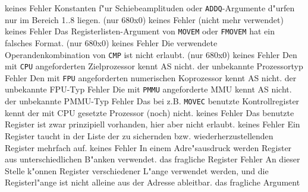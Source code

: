 \documentclass[12pt,a4paper,twoside]{report}
\newcommand{\tty}[1]{{\tt #1}}
\begin{document}
\begin{description}
               {keines}
               {Fehler}
               {Konstanten f"ur Schiebeamplituden oder
                \tty{ADDQ}-Argumente d"urfen nur im Bereich 1..8 liegen. (nur
                680x0)}
               {keines}
               {Fehler}
               {(nicht mehr verwendet)}
               {keines}
               {Fehler}
               {Das Registerlisten-Argument von \tty{MOVEM}
	        oder \tty{FMOVEM} hat ein falsches Format. (nur 680x0)}
               {keines}
               {Fehler}
               {Die verwendete Operandenkombination von \tty{CMP}
	        ist nicht erlaubt. (nur 680x0)}
               {keines}
               {Fehler}
               {Den mit \tty{CPU} angeforderten Zielprozessor kennt AS
                nicht.}
               {der unbekannte Prozessortyp}
               {Fehler}
               {Den mit \tty{FPU} angeforderten numerischen Koprozessor kennt AS
                nicht.}
               {der unbekannte FPU-Typ}
               {Fehler}
               {Die mit \tty{PMMU} angeforderte MMU kennt AS nicht.}
               {der unbekannte PMMU-Typ}
               {Fehler}
               {Das bei z.B. \tty{MOVEC} benutzte
	        Kontrollregister  kennt der mit CPU gesetzte Prozessor
	        (noch) nicht.}
               {keines}
               {Fehler}
               {Das benutzte Register ist zwar prinzipiell
                vorhanden, hier aber nicht erlaubt.}
               {keines}
               {Fehler}
               {Ein Register taucht in der Liste der zu sichernden bzw.
                wiederherzustellenden Register mehrfach auf.}
               {keines}
               {Fehler}
               {In einem Adre"sausdruck werden Register aus unterschiedlichen
                B"anken verwendet.}
               {das fragliche Register}
               {Fehler}
               {An dieser Stelle k"onnen Register verschiedener L"ange verwendet werden,
                und die Registerl"ange ist nicht alleine aus der Adresse ableitbar.}
               {das fragliche Argument}

\end{description}
\end{document}
